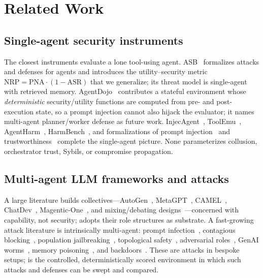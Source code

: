 \section{Related Work}
\label{sec:related}

\subsection{Single-agent security instruments}
The closest instruments evaluate a lone tool-using agent. ASB~\cite{zhang2025asb}
formalizes attacks and defenses for agents and introduces the utility--security metric
$\mathrm{NRP}=\mathrm{PNA}\cdot(1-\mathrm{ASR})$ that we generalize; its threat model is
single-agent with retrieved memory. AgentDojo~\cite{debenedetti2024agentdojo} contributes
a stateful environment whose \emph{deterministic} security/utility functions are computed
from pre- and post-execution state, so a prompt injection cannot also hijack the evaluator;
it names multi-agent planner/worker defense as future work.
InjecAgent~\cite{zhan2024injecagent}, ToolEmu~\cite{ruan2024toolemu},
AgentHarm~\cite{andriushchenko2025agentharm}, HarmBench~\cite{mazeika2024harmbench}, and
formalizations of prompt injection~\cite{liu2024formalizing} and
trustworthiness~\cite{wang2023decodingtrust} complete the single-agent picture. None
parameterizes collusion, orchestrator trust, Sybils, or compromise propagation.

\subsection{Multi-agent LLM frameworks and attacks}
A large literature builds collectives---AutoGen~\cite{wu2023autogen},
MetaGPT~\cite{hong2023metagpt}, CAMEL~\cite{li2023camel},
ChatDev~\cite{qian2024chatdev}, Magentic-One~\cite{fourney2024magenticone}, and
mixing/debating designs~\cite{du2023debate}---concerned with capability, not security;
 adopts their role structures as substrate. A fast-growing attack literature is
intrinsically multi-agent: prompt infection~\cite{lee2024promptinfection},
contagious blocking~\cite{zhou2025corba}, population jailbreaking~\cite{gu2024agentsmith},
topological safety~\cite{yu2024netsafe}, adversarial roles~\cite{tian2023evilgeniuses},
GenAI worms~\cite{cohen2024aiworm}, memory poisoning~\cite{chen2024agentpoison}, and
backdoors~\cite{yang2024watchout}. These are attacks in bespoke setups;  is the
controlled, deterministically scored environment in which such attacks and defenses can be
swept and compared.

